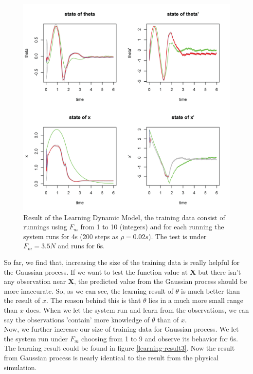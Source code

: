 \documentclass[11pt,twoside,a4paper]{article}
\begin{document}
\begin{figure}[!]
\centering
\includegraphics[width=14cm]{learning-result2.png}
\caption{Result of the Learning Dynamic Model, the training data
  consist of runnings using $F_m$ from 1 to 10 (integers) and for each
  running the system runs for 4s (200 steps as $\rho = 0.02s$). The
  test is under $F_m = 3.5N$ and runs for 6s.}
\label{learning-result2}
\end{figure}

So far, we find that, increasing the size of the training data is
really helpful for the Gaussian process. If we want to test the
function value at $\textbf{X}$ but there isn't any observation near
$\textbf{X}$, the predicted value from the Gaussian process should be
more inaccurate. So, as we can see, the learning result of $\theta$ is
much better than the result of $x$. The reason behind this is that
$\theta$ lies in a much more small range than $x$ does. When we let
the system run and learn from the observations, we can say the
observations 'contain' more knowledge of $\theta$ than of $x$.\\

Now, we further increase our size of training data for Gaussian
process. We let the system run under $F_m$ choosing from 1 to 9 and
observe its behavior for 6s. The learning result could be found in
figure \ref{learning-result3}. Now the result from Gaussian process is
nearly identical to the result from the physical simulation.\\
\end{document}
